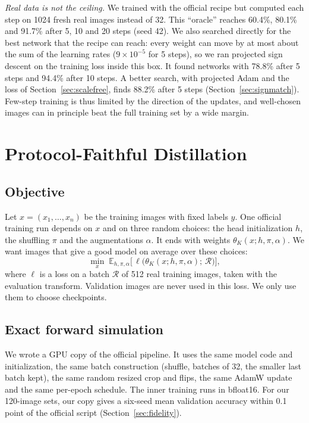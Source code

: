 \documentclass[journal]{IEEEtran}
\begin{document}
\emph{Real data is not the ceiling.} We trained with the official recipe but computed each step on 1024 fresh real
images instead of 32. This ``oracle'' reaches 60.4\%, 80.1\% and 91.7\% after 5, 10 and 20 steps (seed 42).
We also searched directly for the best network that the recipe can reach: every weight can move by at most about the sum
of the learning rates ($9\times10^{-5}$ for 5 steps), so we ran projected sign descent on the training loss inside
this box. It found networks with 78.8\% after 5 steps and 94.4\% after 10 steps. A better search, with projected
Adam and the loss of Section~\ref{sec:scalefree}, finds 88.2\% after 5 steps (Section~\ref{sec:signmatch}). Few-step
training is thus limited by the direction of the updates, and well-chosen images can in principle beat the full
training set by a wide margin.

\section{Protocol-Faithful Distillation}
\label{sec:method}

\subsection{Objective}
Let $x=(x_1,\dots,x_n)$ be the training images with fixed labels $y$. One official training run depends on $x$ and
on three random choices: the head initialization $h$, the shuffling $\pi$ and the augmentations $\alpha$. It ends with
weights $\theta_K(x;h,\pi,\alpha)$. We want images that give a good model on average over these choices:
\begin{equation}
\min_x\; \mathbb{E}_{h,\pi,\alpha}\Big[\,\ell\big(\theta_K(x;h,\pi,\alpha);\,\mathcal{R}\big)\Big],
\label{eq:objective}
\end{equation}
where $\ell$ is a loss on a batch $\mathcal{R}$ of 512 real training images, taken with the evaluation transform.
Validation images are never used in this loss. We only use them to choose checkpoints.

\subsection{Exact forward simulation}
We wrote a GPU copy of the official pipeline. It uses the same model code and initialization, the same batch
construction (shuffle, batches of 32, the smaller last batch kept), the same random resized crop and flips, the same
AdamW update and the same per-epoch schedule. The inner training runs in bfloat16. For our 120-image sets, our copy
gives a six-seed mean validation accuracy within 0.1 point of the official script (Section~\ref{sec:fidelity}).
\end{document}
